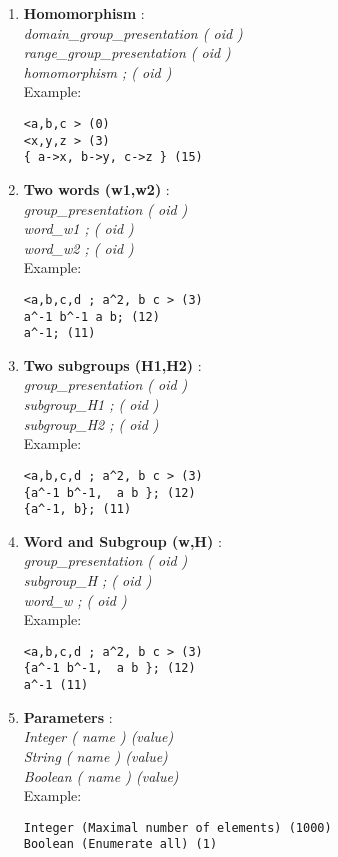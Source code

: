 \documentclass[12pt]{article}
\begin{document}
\begin{enumerate}
\begin{verbatim}
{ a->b, b->c, c->d, d->a } (15)
\end{verbatim}
\item \textbf{Homomorphism} : \\
   {\em  domain\_group\_presentation ( oid ) } \\
   {\em  range\_group\_presentation ( oid ) } \\
{\em   homomorphism ; ( oid ) } \\
Example:
\begin{verbatim}
<a,b,c > (0)
<x,y,z > (3)
{ a->x, b->y, c->z } (15)
\end{verbatim}
\item \textbf{Two words (w1,w2)} :  \\
   {\em  group\_presentation ( oid ) } \\
{\em   word\_w1 ; ( oid ) } \\
{\em   word\_w2 ; ( oid ) } \\
Example:
\begin{verbatim}
<a,b,c,d ; a^2, b c > (3)
a^-1 b^-1 a b; (12)
a^-1; (11)
\end{verbatim}
\item \textbf{Two subgroups (H1,H2)} :  \\
   {\em  group\_presentation ( oid ) } \\
{\em   subgroup\_H1 ; ( oid ) } \\
{\em   subgroup\_H2 ; ( oid ) } \\
Example:
\begin{verbatim}
<a,b,c,d ; a^2, b c > (3)
{a^-1 b^-1,  a b }; (12)
{a^-1, b}; (11)
\end{verbatim}
\item \textbf{Word and Subgroup (w,H)} :  \\
   {\em  group\_presentation ( oid ) } \\
{\em   subgroup\_H ; ( oid ) } \\
{\em   word\_w ; ( oid ) } \\
Example:
\begin{verbatim}
<a,b,c,d ; a^2, b c > (3)
{a^-1 b^-1,  a b }; (12)
a^-1 (11)
\end{verbatim}
\item \textbf{Parameters} : \\
{\em Integer ( name ) (value) } \\
{\em String ( name ) (value) } \\
{\em Boolean ( name ) (value) } \\
Example:
\begin{verbatim}
Integer (Maximal number of elements) (1000)
Boolean (Enumerate all) (1)
\end{verbatim}
\end{enumerate}
\end{document}

